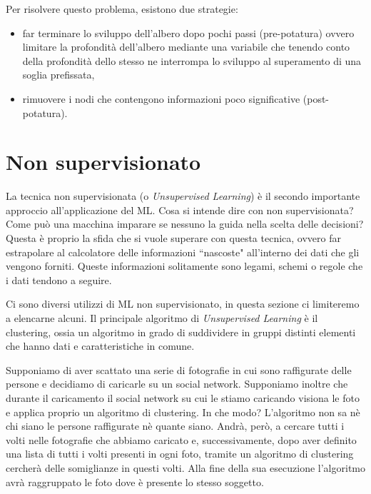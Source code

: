 \documentclass[12pt,italian]{report}
\begin{document}
Per risolvere questo problema, esistono due strategie:
\begin{itemize}
	\item far terminare lo sviluppo dell'albero dopo pochi passi (pre-potatura) ovvero limitare la profondità dell'albero mediante una variabile che tenendo conto della profondità dello stesso ne interrompa lo sviluppo al superamento di una soglia prefissata,
	
	\item rimuovere i nodi che contengono informazioni poco significative (post-potatura).
\end{itemize}

\section{Non supervisionato}
La tecnica non supervisionata (o \emph{Unsupervised Learning}) è il secondo importante approccio all'applicazione del ML. Cosa si intende dire con non supervisionata? Come può una macchina imparare se nessuno la guida nella scelta delle decisioni?
Questa è proprio la sfida che si vuole superare con questa tecnica, ovvero far estrapolare al calcolatore delle informazioni ``nascoste" all'interno dei dati che gli vengono forniti. Queste informazioni solitamente sono legami, schemi o regole che i dati tendono a seguire.

Ci sono diversi utilizzi di ML non supervisionato, in questa sezione ci limiteremo a elencarne alcuni. Il principale algoritmo di \emph{Unsupervised Learning} è il clustering, ossia un algoritmo in grado di suddividere in gruppi distinti elementi che hanno dati e caratteristiche in comune.

Supponiamo di aver scattato una serie di fotografie in cui sono raffigurate delle persone e decidiamo di caricarle su un social network. Supponiamo inoltre che durante il caricamento il social network su cui le stiamo caricando visiona le foto e applica proprio un algoritmo di clustering. In che modo? L'algoritmo non sa nè chi siano le persone raffigurate nè quante siano. Andrà, però, a cercare tutti i volti nelle fotografie che abbiamo caricato e, successivamente, dopo aver definito una lista di tutti i volti presenti in ogni foto, tramite un algoritmo di clustering cercherà delle somiglianze in questi volti. Alla fine della sua esecuzione l'algoritmo avrà raggruppato le foto dove è presente lo stesso soggetto.
\end{document}
